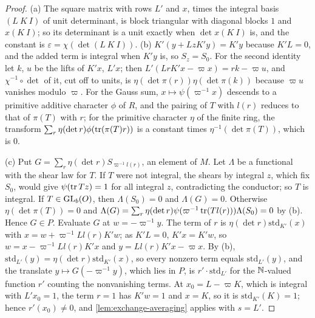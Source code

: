 \begin{proof}
(a) The square matrix with rows $L'$ and $x$, times the integral basis $(L\ K\ I)$ of unit determinant, is block triangular with diagonal blocks $1$ and $x(K\ I)$; so its determinant is a unit exactly when
$\det x(K\ I)$ is, and the constant is $\varepsilon=\chi(\det(L\ K\ I))$. (b) $K'(y+LzK'y)=K'y$ because $K'L=0$, and the added term is integral when $K'y$ is, so $S_z=S_0$. For the second identity let $k$, $u$ be
the lifts of $K'x$, $L'x$; then $L'(LrK'x-\varpi x)=rk-\varpi u$, and $\chi^{-1}\circ\det$ of it, cut off to units, is $\eta(\det\pi(r))\eta(\det\pi(k))$ because $\varpi u$ vanishes modulo $\varpi$. For the Gauss sum,
$x\mapsto\psi(\varpi^{-1}x)$ descends to a primitive additive character $\phi$ of $R$, and the pairing of $T$ with $l(r)$ reduces to that of $\pi(T)$ with $r$; for the primitive character $\eta$ of the finite ring, the
transform $\sum_r\eta(\det r)\phi(\operatorname{tr}(\pi(T)r))$ is a constant times $\eta^{-1}(\det\pi(T))$, which is $0$.

(c) Put $G=\sum_r\eta(\det r)S_{\varpi^{-1}l(r)}$, an element of $M$. Let $\Lambda$ be a functional with the shear law for $T$. If $T$ were not integral, the shears by integral $z$, which fix $S_0$, would give
$\psi(\operatorname{tr} Tz)=1$ for all integral $z$, contradicting the conductor; so $T$ is integral. If $T\in\operatorname{GL}_b(O)$, then $\Lambda(S_0)=0$ and $\Lambda(G)=0$. Otherwise $\eta(\det\pi(T))=0$ and
$\Lambda(G)=\sum_r\eta(\det r)\psi(\varpi^{-1}\operatorname{tr}(Tl(r)))\Lambda(S_0)=0$ by (b). Hence $G\in P$. Evaluate $G$ at $w=-\varpi^{-1}y$. The term of $r$ is $\eta(\det r)\mathrm{std}_{K'}(x)$ with
$x=w+\varpi^{-1}Ll(r)K'w$; as $K'L=0$, $K'x=K'w$, so $w=x-\varpi^{-1}Ll(r)K'x$ and $y=Ll(r)K'x-\varpi x$. By (b), $\mathrm{std}_{L'}(y)=\eta(\det r)\mathrm{std}_{K'}(x)$, so every nonzero term equals
$\mathrm{std}_{L'}(y)$, and the translate $y\mapsto G(-\varpi^{-1}y)$, which lies in $P$, is $r'\cdot\mathrm{std}_{L'}$ for the $\mathbb{N}$-valued function $r'$ counting the nonvanishing terms. At $x_0=L-\varpi K$, which is
integral with $L'x_0=1$, the term $r=1$ has $K'w=1$ and $x=K$, so it is $\mathrm{std}_{K'}(K)=1$; hence $r'(x_0)\ne0$, and \cref{lem:exchange-averaging} applies with $s=L'$.
\end{proof}

